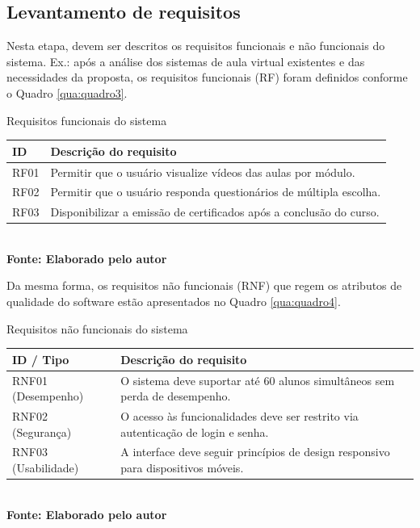 \estrutura\subsection{Levantamento de requisitos}\instrucao
Nesta etapa, devem ser descritos os requisitos funcionais e não funcionais do sistema. Ex.: após a análise dos sistemas de aula virtual existentes e das necessidades da proposta, os requisitos funcionais (RF) foram definidos conforme o Quadro \ref{qua:quadro3}.

\begin{quadro}[H]
    \centering
    \caption{Requisitos funcionais do sistema}
    \label{qua:quadro3}
    \begin{tabular}{|C{2cm}|C{12.5cm}|}
    \hline
    \textbf{ID} & \textbf{Descrição do requisito} \\ \hline
    RF01 & Permitir que o usuário visualize vídeos das aulas por módulo. \\ \hline
    RF02 & Permitir que o usuário responda questionários de múltipla escolha. \\ \hline
    RF03 & Disponibilizar a emissão de certificados após a conclusão do curso. \\ \hline
    \end{tabular}
    \vspace{.1cm} 
    \small
    {\footnotesize\\ \textbf{Fonte: Elaborado pelo autor}}
\end{quadro}

Da mesma forma, os requisitos não funcionais (RNF) que regem os atributos de qualidade do software estão apresentados no Quadro \ref{qua:quadro4}.

\begin{quadro}[H]
    \centering
    \caption{Requisitos não funcionais do sistema}
    \label{qua:quadro4}
    \begin{tabular}{|C{2.5cm}|C{12.5cm}|}
    \hline
    \textbf{ID / Tipo} & \textbf{Descrição do requisito} \\ \hline
    RNF01 (Desempenho) & O sistema deve suportar até 60 alunos simultâneos sem perda de desempenho. \\ \hline
    RNF02 (Segurança) & O acesso às funcionalidades deve ser restrito via autenticação de login e senha. \\ \hline
    RNF03 (Usabilidade) & A interface deve seguir princípios de design responsivo para dispositivos móveis. \\ \hline
    \end{tabular}
    \vspace{.1cm} 
    \small
    {\footnotesize\\ \textbf{Fonte: Elaborado pelo autor}}
\end{quadro}


